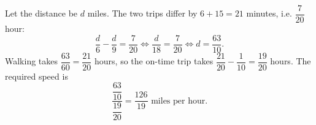 Let the distance be $d$ miles. The two trips differ by $6+15=21$ minutes, i.e. $\dfrac{7}{20}$ hour:
\[\dfrac d6-\dfrac d9=\dfrac{7}{20}\iff\dfrac{d}{18}=\dfrac{7}{20}\iff d=\dfrac{63}{10}.\]
Walking takes $\dfrac{63}{60}=\dfrac{21}{20}$ hours, so the on-time trip takes $\dfrac{21}{20}-\dfrac{1}{10}=\dfrac{19}{20}$ hours. The required speed is
\[\dfrac{\dfrac{63}{10}}{\dfrac{19}{20}}=\boxed{\dfrac{126}{19}}\text{ miles per hour}.\]
